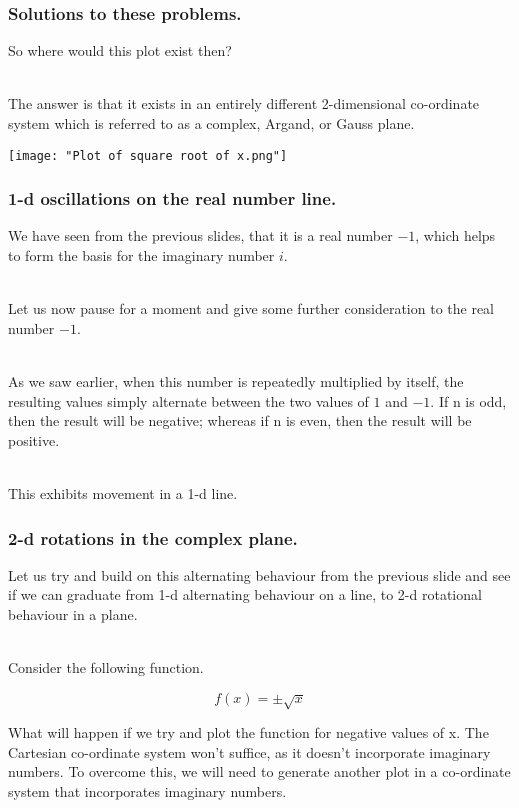 %
%

\begin{frame}
\frametitle{Solutions to these problems.}

So where would this plot exist then?\\~\

The answer is that it exists in an entirely different 2-dimensional co-ordinate system which is referred to as a complex, Argand, or Gauss plane.

\texttt{[image: "Plot of square root of x.png"]}

\end{frame}


%
%

\begin{frame}
\frametitle{1-d oscillations on the real number line.}

We have seen from the previous slides, that it is a real number \(-1\), which helps to form the basis for the imaginary number \(i\).\\~\

Let us now pause for a moment and give some further consideration to the real number \(-1\).\\~\

As we saw earlier, when this number is repeatedly multiplied by itself, the resulting values simply alternate between the two values of \(1\) and \(-1\).
If n is odd, then the result will be negative; whereas if n is even, then the result will be positive.\\~\

This exhibits movement in a 1-d line.

\end{frame}


%
%

\begin{frame}
\frametitle{2-d rotations in the complex plane.}

Let us try and build on this alternating behaviour from the previous slide and see if we can graduate from 1-d alternating behaviour on a line, to 2-d
rotational behaviour in a plane.\\~\

Consider the following function.

\begin{equation}
  f(x) = \pm\sqrt{x}
\end{equation}

What will happen if we try and plot the function for negative values of x. The Cartesian co-ordinate system won't suffice, as it doesn't incorporate
imaginary numbers. To overcome this, we will need to generate another plot in a co-ordinate system that incorporates imaginary numbers.\\~\

\end{frame}


